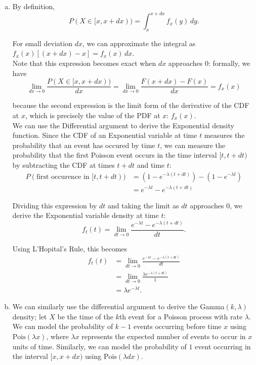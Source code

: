 \begin{enumerate}[a)]
    \item By definition, 
    \[
        P(X \in [x, x+ dx)) = \int_{x}^{x+dx} f_x(y) \, dy.
    \]

    For small deviation $dx$, we can approximate the integral as $f_x(x)\left[ (x + dx) - x \right] = f_x(x)\, dx$. \\

    Note that this expression becomes exact when $dx$ approaches $0$: formally, we have
    \[
        \lim_{dx \to 0} \frac{P(X \in [x, x+dx))}{dx} = \lim_{dx \to 0} \frac{F(x+dx) - F(x)}{dx} = f_x(x)
    \]

    because the second expression is the limit form of the derivative of the CDF at $x$, which is precisely the value of the PDF at $x$: 
    $f_x(x)$. \\

    We can use the Differential argument to derive the Exponential density function. 
    Since the CDF of an Exponential variable at time $t$ measures the probability that an event has occured by time $t$, we can measure the probability
    that the first Poisson event occurs in the time interval $[t, t+dt)$ by subtracting the CDF at times $t+dt$ and time $t$:
    \begin{align*}
        P(\text{first occurence in } [t, t+dt)) &= \left( 1 - e^{-\lambda(t+dt)}\right) - \left( 1 - e^{-\lambda t} \right) \\
        &= e^{-\lambda t} - e^{-\lambda(t+dt)}
    \end{align*}

    Dividing this expression by $dt$ and taking the limit as $dt$ approaches $0$, we derive the Exponential variable density at time $t$:
    \[
        f_t(t) = \lim_{dt \to 0} \frac{e^{-\lambda t} - e^{-\lambda (t+dt)}}{dt}.
    \]

    Using L'Hopital's Rule, this becomes
    \begin{align*}
        f_t(t) &= \lim_{dt \to 0} \frac{e^{-\lambda t} - e^{-\lambda (t+dt)}}{dt} \\
        &= \lim_{dt \to 0} \frac{\lambda e^{-\lambda (t+dt)}}{1} \\
        &= \lambda e^{-\lambda t}.
    \end{align*}

    \item We can similarly use the differential argument to derive the Gamma$(k, \lambda)$ density; let $X$ be the time of the $k$th event for a Poisson process with rate $\lambda$.
    We can model the probability of $k-1$ events occurring before time $x$ using $\mathrm{Pois}(\lambda x)$, where $\lambda x$ represents the expected number of events to occur
    in $x$ units of time. Similarly, we can model the probability of $1$ event occurring in the interval $[x, x+dx)$ using $\mathrm{Pois}(\lambda dx)$. \\


\end{enumerate}
